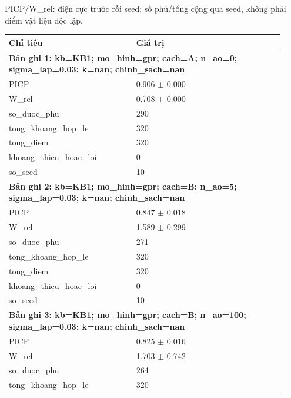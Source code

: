 \par\smallskip\noindent PICP/W\_rel: điện cực trước rồi seed; số phủ/tổng cộng qua seed, không phải điểm vật liệu độc lập.\par
\begin{longtable}{p{0.43\linewidth}p{0.50\linewidth}}
\toprule Chỉ tiêu & Giá trị \\ \midrule \endhead
\multicolumn{2}{p{0.95\linewidth}}{\textbf{Bản ghi 1: kb=KB1; mo\_hinh=gpr; cach=A; n\_ao=0; sigma\_lap=0.03; k=nan; chinh\_sach=nan}} \\
PICP & 0.906 $\pm$ 0.000 \\
W\_\allowbreak rel & 0.708 $\pm$ 0.000 \\
so\_\allowbreak duoc\_\allowbreak phu & 290 \\
tong\_\allowbreak khoang\_\allowbreak hop\_\allowbreak le & 320 \\
tong\_\allowbreak diem & 320 \\
khoang\_\allowbreak thieu\_\allowbreak hoac\_\allowbreak loi & 0 \\
so\_\allowbreak seed & 10 \\
\midrule
\multicolumn{2}{p{0.95\linewidth}}{\textbf{Bản ghi 2: kb=KB1; mo\_hinh=gpr; cach=B; n\_ao=5; sigma\_lap=0.03; k=nan; chinh\_sach=nan}} \\
PICP & 0.847 $\pm$ 0.018 \\
W\_\allowbreak rel & 1.589 $\pm$ 0.299 \\
so\_\allowbreak duoc\_\allowbreak phu & 271 \\
tong\_\allowbreak khoang\_\allowbreak hop\_\allowbreak le & 320 \\
tong\_\allowbreak diem & 320 \\
khoang\_\allowbreak thieu\_\allowbreak hoac\_\allowbreak loi & 0 \\
so\_\allowbreak seed & 10 \\
\midrule
\multicolumn{2}{p{0.95\linewidth}}{\textbf{Bản ghi 3: kb=KB1; mo\_hinh=gpr; cach=B; n\_ao=100; sigma\_lap=0.03; k=nan; chinh\_sach=nan}} \\
PICP & 0.825 $\pm$ 0.016 \\
W\_\allowbreak rel & 1.703 $\pm$ 0.742 \\
so\_\allowbreak duoc\_\allowbreak phu & 264 \\
tong\_\allowbreak khoang\_\allowbreak hop\_\allowbreak le & 320 \\

\end{longtable}
